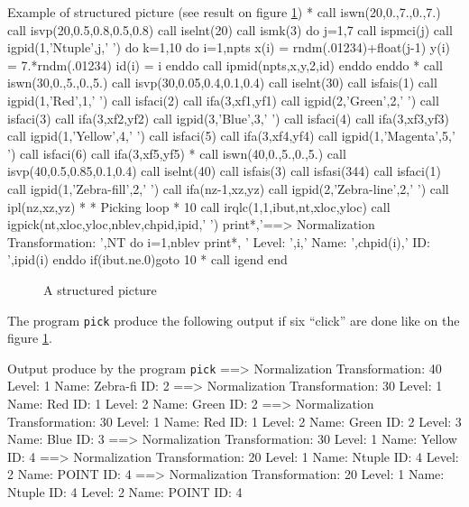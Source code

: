 \begin{XMPt}{Example of structured picture (see result on figure \ref{PICK})}
*
      call iswn(20,0.,7.,0.,7.)
      call isvp(20,0.5,0.8,0.5,0.8)
      call iselnt(20)
      call ismk(3)
      do j=1,7
         call ispmci(j)
         call igpid(1,'Ntuple',j,' ')
         do k=1,10
            do i=1,npts
               x(i)  = rndm(.01234)+float(j-1)
               y(i)  = 7.*rndm(.01234)
               id(i) = i 
            enddo
            call ipmid(npts,x,y,2,id)
         enddo
      enddo
*
      call iswn(30,0.,5.,0.,5.)
      call isvp(30,0.05,0.4,0.1,0.4)
      call iselnt(30)
      call isfais(1)
      call igpid(1,'Red',1,' ')
      call isfaci(2)
      call ifa(3,xf1,yf1)
      call igpid(2,'Green',2,' ')
      call isfaci(3)
      call ifa(3,xf2,yf2)
      call igpid(3,'Blue',3,' ')
      call isfaci(4)
      call ifa(3,xf3,yf3)
      call igpid(1,'Yellow',4,' ')
      call isfaci(5)
      call ifa(3,xf4,yf4)
      call igpid(1,'Magenta',5,' ')
      call isfaci(6)
      call ifa(3,xf5,yf5)
*
      call iswn(40,0.,5.,0.,5.)
      call isvp(40,0.5,0.85,0.1,0.4)
      call iselnt(40)
      call isfais(3)
      call isfasi(344)
      call isfaci(1)
      call igpid(1,'Zebra-fill',2,' ')
      call ifa(nz-1,xz,yz)
      call igpid(2,'Zebra-line',2,' ')
      call ipl(nz,xz,yz)
*
*              Picking loop
*
  10  call irqlc(1,1,ibut,nt,xloc,yloc)
      call igpick(nt,xloc,yloc,nblev,chpid,ipid,' ')
      print*,'==> Normalization Transformation: ',NT
      do i=1,nblev
         print*, '    Level: ',i,' Name: ',chpid(i),' ID: ',ipid(i)
      enddo
      if(ibut.ne.0)goto 10
*
      call igend
      end
\end{XMPt}

\begin{figure}[p]
\begin{center}
\mbox{}
\end{center}
\caption{A structured picture}
\label{PICK}
\end{figure}

\newpage
The program {\tt pick} produce the following output if six ``click'' 
are done like on the figure \ref{PICK}.

\begin{XMPt}{Output produce by the program {\tt pick}}
 ==> Normalization Transformation:  40
     Level:  1 Name: Zebra-fi ID:  2
 ==> Normalization Transformation:  30
     Level:  1 Name: Red      ID:  1
     Level:  2 Name: Green    ID:  2
 ==> Normalization Transformation:  30
     Level:  1 Name: Red      ID:  1
     Level:  2 Name: Green    ID:  2
     Level:  3 Name: Blue     ID:  3
 ==> Normalization Transformation:  30
     Level:  1 Name: Yellow   ID:  4
 ==> Normalization Transformation:  20
     Level:  1 Name: Ntuple   ID:  4
     Level:  2 Name: POINT    ID:  4
 ==> Normalization Transformation:  20
     Level:  1 Name: Ntuple   ID:  4
     Level:  2 Name: POINT    ID:  4
\end{XMPt}

